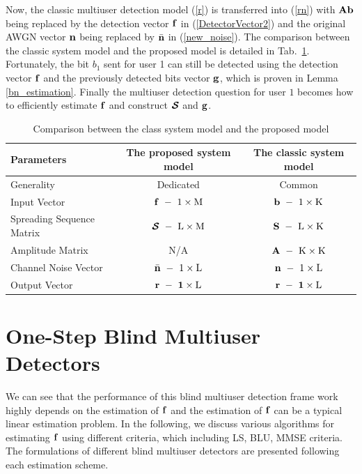 \documentclass[a4paper,11pt,fleqn]{article}
\newcommand{\bA}{{\mathbf A}}
\newcommand{\bb}{{\bf b}}
\newcommand{\bg}{{\bf g}}
\newcommand{\bn}{{\bf n}}
\newcommand{\bbf}{{\bf f}}
\newcommand{\bS}{{\bf S}}
\newcommand{\bcS}{{\mbox {\boldmath ${\cal S}$}}}
\begin{document}
Now, the classic multiuser detection model (\ref{r}) is
transferred into (\ref{rn}) with $\bA\bb$ being replaced by the
detection vector $\bbf$ in (\ref{DetectorVector2}) and the
original AWGN vector $\bn$ being replaced by $\bar{\bn}$ in
(\ref{new_noise}). The comparison between the classic system model
and the proposed model is detailed in Tab.~\ref{ModelComp}.
Fortunately, the bit $b_1$ sent for user 1 can still be detected
using the detection vector $\bbf$ and the previously detected bits
vector $\bg$, which is proven in  Lemma \ref{bn_estimation}.
Finally the multiuser detection question for user $1$ becomes how
to efficiently estimate $\bbf$ and construct $\bcS$ and $\bg$.


\begin{table}
\caption{Comparison between the class system model and the
proposed model}\label{ModelComp}
\begin{center}
\begin{tabular}{lcc}
Parameters&The proposed system model&The classic system model\\
\hline
Generality& Dedicated& Common\\
Input Vector &$\bbf\ -\ 1\times\rm M$&$\bb\ -\ 1\times\rm K$\\
Spreading Sequence Matrix &$\bcS\ -\ \rm L\times\rm M$&$\bS\ -\ \rm L\times\rm K$\\
Amplitude Matrix & N/A &$\bf{A}\ -\ \rm K\times\rm K$\\
Channel Noise Vector &$\bar\bn\ -\ 1\times\rm L$&$\bn\ -\ 1\times\rm L$\\
Output Vector&$\bf{r}\ -\ 1\times\rm L$&$\bf{r}\ -\ 1\times\rm L$\\
 \hline
\end{tabular}
\end{center}
\end{table}

\pagebreak


\section{One-Step Blind Multiuser Detectors\label{LBD}}

We can see that the performance of this blind multiuser detection
frame work highly depends on the estimation of $\bbf$ and the
estimation of $\bbf$ can be a typical linear estimation problem.
In the following, we discuss various algorithms for estimating
$\bbf$ using different criteria, which including LS, BLU, MMSE
criteria. The formulations of different blind multiuser detectors
are presented following each estimation scheme.
\end{document}
